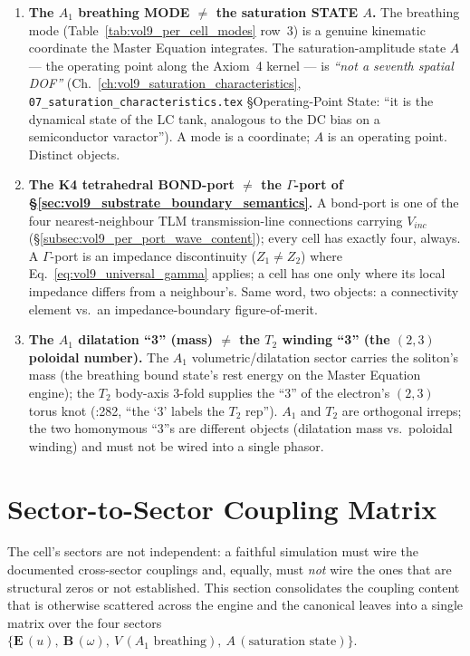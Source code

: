 \begin{enumerate}
    \item[(i)] \textbf{The $A_1$ breathing MODE $\neq$ the saturation STATE $A$.} The breathing mode (Table~\ref{tab:vol9_per_cell_modes} row~3) is a genuine kinematic coordinate the Master Equation integrates. The saturation-amplitude state $A$ --- the operating point along the Axiom~4 kernel --- is \emph{``not a seventh spatial DOF''} (Ch.~\ref{ch:vol9_saturation_characteristics}, \texttt{07\_saturation\_characteristics.tex} \S Operating-Point State: ``it is the dynamical state of the LC tank, analogous to the DC bias on a semiconductor varactor''). A mode is a coordinate; $A$ is an operating point. Distinct objects.
    \item[(ii)] \textbf{The K4 tetrahedral BOND-port $\neq$ the $\Gamma$-port of \S\ref{sec:vol9_substrate_boundary_semantics}.} A bond-port is one of the four nearest-neighbour TLM transmission-line connections carrying $V_{inc}$ (\S\ref{subsec:vol9_per_port_wave_content}); every cell has exactly four, always. A $\Gamma$-port is an impedance discontinuity ($Z_1 \neq Z_2$) where Eq.~\ref{eq:vol9_universal_gamma} applies; a cell has one only where its local impedance differs from a neighbour's. Same word, two objects: a connectivity element vs.\ an impedance-boundary figure-of-merit.
    \item[(iii)] \textbf{The $A_1$ dilatation ``3'' (mass) $\neq$ the $T_2$ winding ``3'' (the $(2,3)$ poloidal number).} The $A_1$ volumetric/dilatation sector carries the soliton's mass (the breathing bound state's rest energy on the Master Equation engine); the $T_2$ body-axis 3-fold supplies the ``3'' of the electron's $(2,3)$ torus knot (:282, ``the `3' labels the $T_2$ rep''). $A_1$ and $T_2$ are orthogonal irreps; the two homonymous ``3''s are different objects (dilatation mass vs.\ poloidal winding) and must not be wired into a single phasor.
\end{enumerate}

\section{Sector-to-Sector Coupling Matrix}
\label{sec:vol9_sector_coupling_matrix}

The cell's sectors are not independent: a faithful simulation must wire the documented cross-sector couplings and, equally, must \emph{not} wire the ones that are structural zeros or not established. This section consolidates the coupling content that is otherwise scattered across the engine and the canonical leaves into a single matrix over the four sectors $\{\mathbf{E}\,(u),\ \mathbf{B}\,(\omega),\ V\,(A_1\text{ breathing}),\ A\,(\text{saturation state})\}$.

